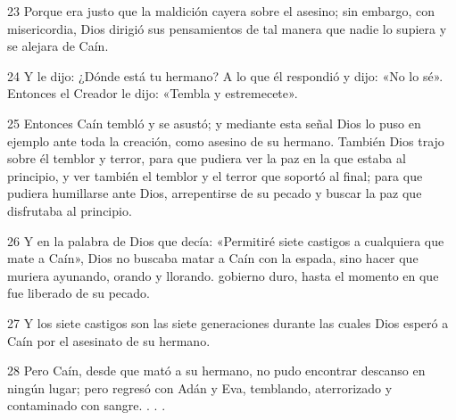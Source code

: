 \par 23 Porque era justo que la maldición cayera sobre el asesino; sin embargo, con misericordia, Dios dirigió sus pensamientos de tal manera que nadie lo supiera y se alejara de Caín.

\par 24 Y le dijo: ¿Dónde está tu hermano? A lo que él respondió y dijo: «No lo sé». Entonces el Creador le dijo: «Tembla y estremecete».

\par 25 Entonces Caín tembló y se asustó; y mediante esta señal Dios lo puso en ejemplo ante toda la creación, como asesino de su hermano. También Dios trajo sobre él temblor y terror, para que pudiera ver la paz en la que estaba al principio, y ver también el temblor y el terror que soportó al final; para que pudiera humillarse ante Dios, arrepentirse de su pecado y buscar la paz que disfrutaba al principio.

\par 26 Y en la palabra de Dios que decía: «Permitiré siete castigos a cualquiera que mate a Caín», Dios no buscaba matar a Caín con la espada, sino hacer que muriera ayunando, orando y llorando. gobierno duro, hasta el momento en que fue liberado de su pecado.

\par 27 Y los siete castigos son las siete generaciones durante las cuales Dios esperó a Caín por el asesinato de su hermano.

\par 28 Pero Caín, desde que mató a su hermano, no pudo encontrar descanso en ningún lugar; pero regresó con Adán y Eva, temblando, aterrorizado y contaminado con sangre. . . .


